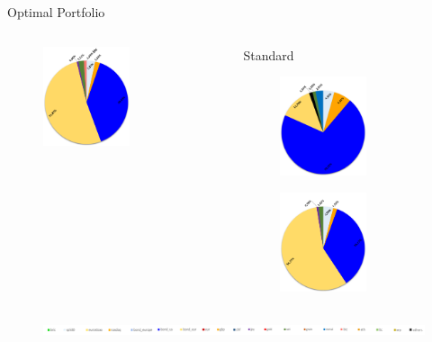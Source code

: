 \documentclass[c, 10pt]{beamer}
\newcommand\Fontvi{\fontsize{8}{7.2}\selectfont}
\begin{document}
\begin{frame}{Optimal Portfolio}
\begin{columns}
\begin{column}{0.3\textwidth}
\begin{figure}
            \end{figure}
            \begin{figure}
                \centering
                \includegraphics[width=2.55cm]{Images/torte/torta_half_btc.png}
            \end{figure}
		\end{column}
    	\begin{column}{0.3\textwidth} 
    	    \begin{center}
            \Fontvi{}Standard
            \end{center}
            \begin{figure}
                \centering
                \includegraphics[width=2.55cm]{Images/torte/torta_whole_no.png}
            \end{figure}
            \begin{figure}
                \centering
                \includegraphics[width=2.55cm]{Images/torte/torta_half_no.png}
            \end{figure}
		\end{column}
	\end{columns}
	\begin{figure}
	    \centering
	    \includegraphics[width=\linewidth]{Images/legend.PNG}
	\end{figure}
\end{frame}
\end{document}
